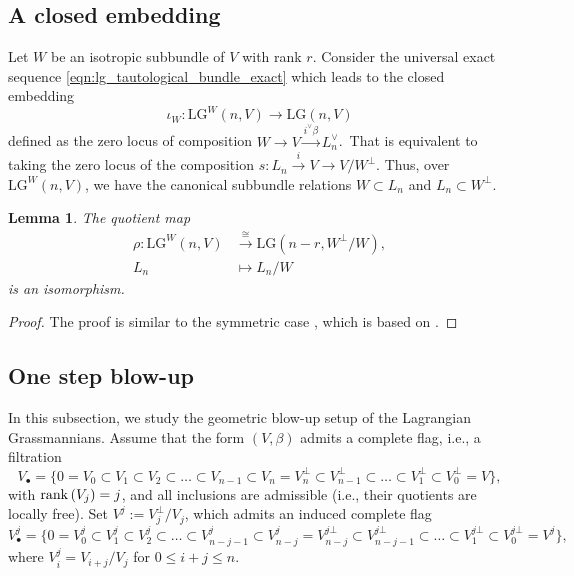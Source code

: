 \documentclass[a4paper]{amsart}
\theoremstyle{plain}
\newtheorem{lemma}[theorem]{Lemma}
\theoremstyle{definition}
\numberwithin{equation}{section}
\newcommand{\rank}{\mathrm{rank}\,\relax}
\newcommand{\LG}{\mathrm{LG}}
\begin{document}
\subsection{A closed embedding}
Let $W$ be an isotropic subbundle of $V$ with rank $r$. Consider the universal exact sequence \eqref{eqn:lg_tautological_bundle_exact}
which leads to the closed embedding
$$\iota_W: \LG^{W}(n,V) \to \LG(n,V)$$
defined as the zero locus of composition $W \to V \xrightarrow{i^\vee\beta} L_n^\vee$.\
That is equivalent to taking the zero locus of the composition $s: L_n \xrightarrow{i} V \to V /W^\perp$.
Thus, over $\LG^{W}(n,V)$, we have the canonical subbundle relations $W \subset L_n$ and $L_n \subset W^\perp$.

\begin{lemma}
    The quotient map
    \[
        \begin{aligned}
            \rho:  \LG^{W}(n,V) & \xrightarrow{\cong} \LG(n-r,W^\perp/W), \\
            L_n                 & \mapsto L_n/W
        \end{aligned}
    \]
    is an isomorphism.
\end{lemma}
\begin{proof}
    The proof is similar to the symmetric case \cite[Lemma 2.12]{hudson2022witt}, which is based on \cite[Proposition 6.5]{quebbemann1979quadratic}.
\end{proof}
\subsection{One step blow-up}\label{subsec:lg-geometric}
In this subsection, we study the geometric blow-up setup of the Lagrangian Grassmannians. Assume that the form $(V,\beta)$ admits a complete flag, i.e., a filtration
\[
    V_{\bullet} = \{0=V_{0} \subset V_{1} \subset V_{2} \subset \ldots \subset V_{n-1} \subset V_{n} = V_{n}^{\bot} \subset V_{n-1}^{\bot} \subset \ldots \subset V_{1}^{\bot} \subset V_{0}^{\bot} = V\},
\]
with $\rank(V_j) = j$, and all inclusions are admissible (i.e., their quotients are locally free). Set $V^{j}:=V_{j}^{\bot}/V_{j}$, which admits an induced complete flag
\[
    V^{j}_{\bullet} = \{0=V^{j}_{0} \subset V^{j}_{1} \subset V^{j}_{2} \subset \ldots \subset V^{j}_{n-j-1} \subset V^{j}_{n-j} = V_{n-j}^{j \bot} \subset V_{n-j-1}^{j \bot} \subset \ldots \subset V_{1}^{j \bot} \subset V_{0}^{j \bot} = V^{j}\},
\]
where $V^{j}_{i} = V_{i+j}/V_{j}$ for $0\leq i+j\leq n$.
\end{document}
